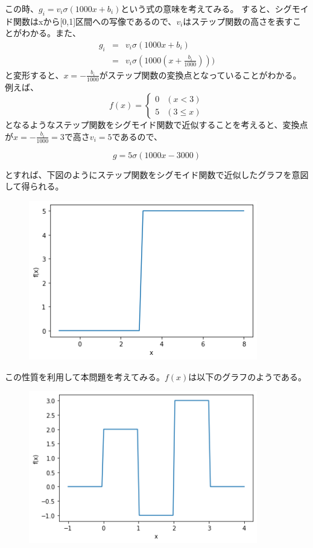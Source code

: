 \documentclass[a4j,11pt]{jarticle}
\begin{document}
この時、$g_i = v_i\sigma(1000x + b_i)$という式の意味を考えてみる。
すると、シグモイド関数はxから[0,1]区間への写像であるので、$v_i$はステップ関数の高さを表すことがわかる。また、
\begin{eqnarray*}
    g_i &=& v_i\sigma(1000x + b_i)\\
    &=& v_i\sigma\left( 1000(x + \frac{b_i}{1000}) \right))
\end{eqnarray*}
と変形すると、$x = -\frac{b_i}{1000}$がステップ関数の変換点となっていることがわかる。例えば、
\begin{equation*}
    f(x) = 
    \left\{
        \begin{array}{ll}
            0 & (x < 3) \\
            5 & (3 \leq x)
        \end{array}
    \right.
\end{equation*}
となるようなステップ関数をシグモイド関数で近似することを考えると、変換点が$x = -\frac{b_i}{1000} = 3$で高さ$v_i=5で$あるので、

\begin{equation*}
    g = 5\sigma(1000x - 3000)
\end{equation*}

とすれば、下図のようにステップ関数をシグモイド関数で近似したグラフを意図して得られる。
\begin{figure}[hbtp]
    \centering
    \includegraphics[width=10cm]{p1-4.png}
\end{figure}

\newpage

この性質を利用して本問題を考えてみる。$f(x)$は以下のグラフのようである。
\begin{figure}[hbtp]
    \centering
    \includegraphics[width=10cm]{p1-2.png}
\end{figure}
\end{document}
